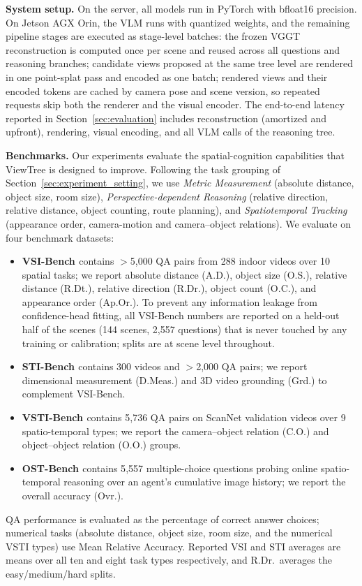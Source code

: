 \documentclass[sigconf,10pt]{acmart}
\begin{document}
\noindent\textbf{System setup.} On the server, all models run in PyTorch with bfloat16 precision. On Jetson AGX Orin, the VLM runs with quantized weights, and the remaining pipeline stages are executed as stage-level batches: the frozen VGGT \cite{vggt2025} reconstruction is computed once per scene and reused across all questions and reasoning branches; candidate views proposed at the same tree level are rendered in one point-splat pass and encoded as one batch; rendered views and their encoded tokens are cached by camera pose and scene version, so repeated requests skip both the renderer and the visual encoder. The end-to-end latency reported in Section~\ref{sec:evaluation} includes reconstruction (amortized and upfront), rendering, visual encoding, and all VLM calls of the reasoning tree.

\noindent\textbf{Benchmarks.} Our experiments evaluate the spatial-cognition capabilities that ViewTree is designed to improve. Following the task grouping of Section~\ref{sec:experiment_setting}, we use \emph{Metric Measurement} (absolute distance, object size, room size), \emph{Perspective-dependent Reasoning} (relative direction, relative distance, object counting, route planning), and \emph{Spatiotemporal Tracking} (appearance order, camera-motion and camera--object relations). We evaluate on four benchmark datasets:
\begin{itemize}
    \item \textbf{VSI-Bench \cite{vsibench2024}} contains $>$5{,}000 QA pairs from 288 indoor videos over 10 spatial tasks; we report absolute distance (A.D.), object size (O.S.), relative distance (R.Dt.), relative direction (R.Dr.), object count (O.C.), and appearance order (Ap.Or.). To prevent any information leakage from confidence-head fitting, all VSI-Bench numbers are reported on a held-out half of the scenes (144 scenes, 2{,}557 questions) that is never touched by any training or calibration; splits are at scene level throughout.
    \item \textbf{STI-Bench \cite{li2025sti}} contains 300 videos and $>$2{,}000 QA pairs; we report dimensional measurement (D.Meas.) and 3D video grounding (Grd.) to complement VSI-Bench.
    \item \textbf{VSTI-Bench \cite{vstibench2026}} contains 5{,}736 QA pairs on ScanNet validation videos over 9 spatio-temporal types; we report the camera--object relation (C.O.) and object--object relation (O.O.) groups.
    \item \textbf{OST-Bench \cite{ostbench2025}} contains 5{,}557 multiple-choice questions probing online spatio-temporal reasoning over an agent's cumulative image history; we report the overall accuracy (Ovr.).
\end{itemize}
QA performance is evaluated as the percentage of correct answer choices; numerical tasks (absolute distance, object size, room size, and the numerical VSTI types) use Mean Relative Accuracy. Reported VSI and STI averages are means over all ten and eight task types respectively, and R.Dr.\ averages the easy/medium/hard splits.
\end{document}
